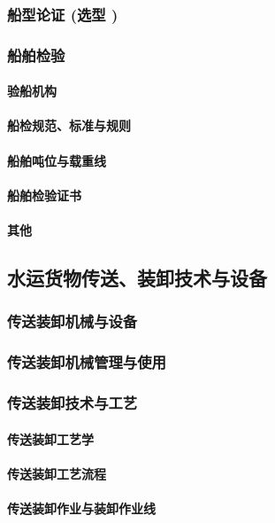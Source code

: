 \documentclass[UTF8]{../ApplicationUniverse}
\begin{document}
        \subsubsection{船型论证 (选型 )}
        \subsubsection{船舶检验}
            \paragraph{验船机构}
            \paragraph{船检规范、标准与规则}
            \paragraph{船舶吨位与载重线}
            \paragraph{船舶检验证书}
            \paragraph{其他}
    \subsection{水运货物传送、装卸技术与设备}
        \subsubsection{传送装卸机械与设备}
        \subsubsection{传送装卸机械管理与使用}
        \subsubsection{传送装卸技术与工艺}
            \paragraph{传送装卸工艺学}
            \paragraph{传送装卸工艺流程}
            \paragraph{传送装卸作业与装卸作业线}
\end{document}
